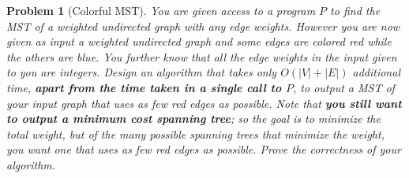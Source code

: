 \documentclass[10pt]{article}
\newtheorem{problem}{\sc\color{cit}Problem}
\begin{document}
\newpage


\begin{problem}[Colorful MST]
    You are given access to a program $P$ to find the MST of a weighted undirected graph with any edge weights. However you are now given as input a weighted undirected graph and some edges are colored red while the others are blue. You further know that all the edge weights in the input given to you are integers. Design an algorithm that takes only $O(|V|+|E|)$ additional time, \textbf{apart from the time taken in a single call to $P$}, to output a MST of your input graph that uses as few red edges as possible. Note that \textbf{you still want to output a minimum cost spanning tree}; so the goal is to minimize the total weight, but of the many possible spanning trees that minimize the weight, you want one that uses as few red edges as possible. Prove the correctness of your algorithm.
\end{problem}
\end{document}
